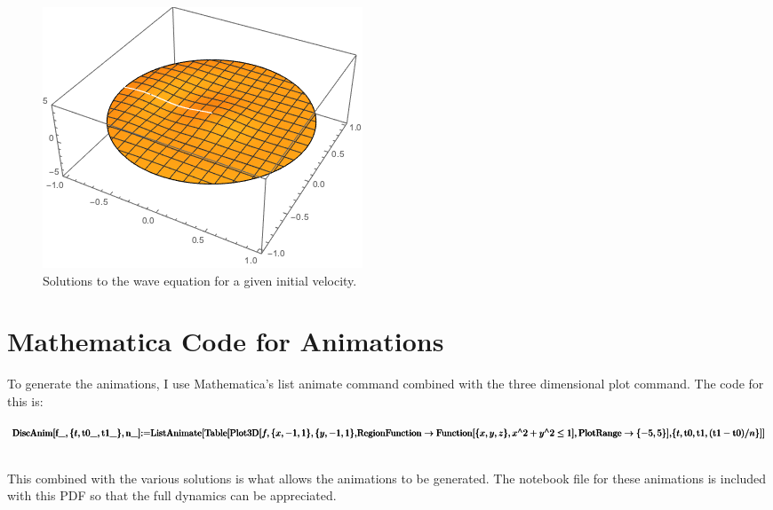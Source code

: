 \documentclass{paper}
\begin{document}
\begin{figure}[!htb]
      \includegraphics[width=\linewidth]{images/waves3.png}
    \endminipage
    \caption{Solutions to the wave equation for a given initial velocity.}
    \end{figure}
\newpage
\section{Mathematica Code for Animations}
To generate the animations, I use Mathematica's list animate command combined with the three dimensional plot command. The code for this is: \\

\begin{doublespace}
\noindent\(\pmb{\text{DiscAnim}[\text{f$\_$},\{t,\text{t0$\_$},\text{t1$\_$}\},\text{n$\_$}]\text{:=}}\\
\pmb{\text{ListAnimate}[}\\
\pmb{\text{Table}[\text{Plot3D}[f,\{x,-1,1\},\{y,-1,1\},}\\
\pmb{\text{RegionFunction}\to \text{Function}[\{x,y,z\},x{}^{\wedge}2+y{}^{\wedge}2\leq 1],\text{PlotRange}\to \{-5,5\}],}\\
\pmb{\{t,\text{t0},\text{t1},(\text{t1}-\text{t0})/n\}]]}\)
\end{doublespace}
\\
This combined with the various solutions is what allows the animations to be generated. The notebook file for these animations is included with this PDF so that the full dynamics can be appreciated.
\newpage
\end{document}
